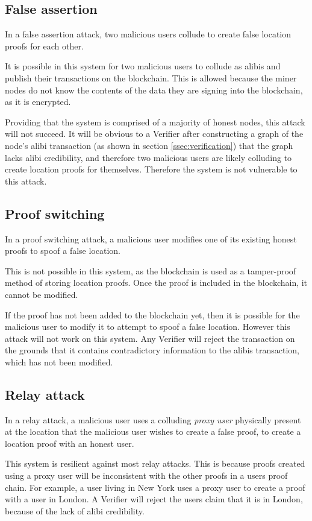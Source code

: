 \subsection{False assertion}
In a false assertion attack, two malicious users collude to create false location proofs for each other.

It is possible in this system for two malicious users to collude as alibis and publish their transactions on the blockchain. This is allowed because the miner nodes do not know the contents of the data they are signing into the blockchain, as it is encrypted.

Providing that the system is comprised of a majority of honest nodes, this attack will not succeed. It will be obvious to a Verifier after constructing a graph of the node's alibi transaction (as shown in section \ref{ssec:verification}) that the graph lacks alibi credibility, and therefore two malicious users are likely colluding to create location proofs for themselves. Therefore the system is not vulnerable to this attack.

\subsection{Proof switching}
In a proof switching attack, a malicious user modifies one of its existing honest proofs to spoof a false location.

This is not possible in this system, as the blockchain is used as a tamper-proof method of storing location proofs. Once the proof is included in the blockchain, it cannot be modified.

If the proof has not been added to the blockchain yet, then it is possible for the malicious user to modify it to attempt to spoof a false location. However this attack will not work on this system. Any Verifier will reject the transaction on the grounds that it contains contradictory information to the alibis transaction, which has not been modified.

\subsection{Relay attack}
In a relay attack, a malicious user uses a colluding \textit{proxy user} physically present at the location that the malicious user wishes to create a false proof, to create a location proof with an honest user.

This system is resilient against most relay attacks. This is because proofs created using a proxy user will be inconsistent with the other proofs in a users proof chain. For example, a user living in New York uses a proxy user to create a proof with a user in London. A Verifier will reject the users claim that it is in London, because of the lack of alibi credibility.

